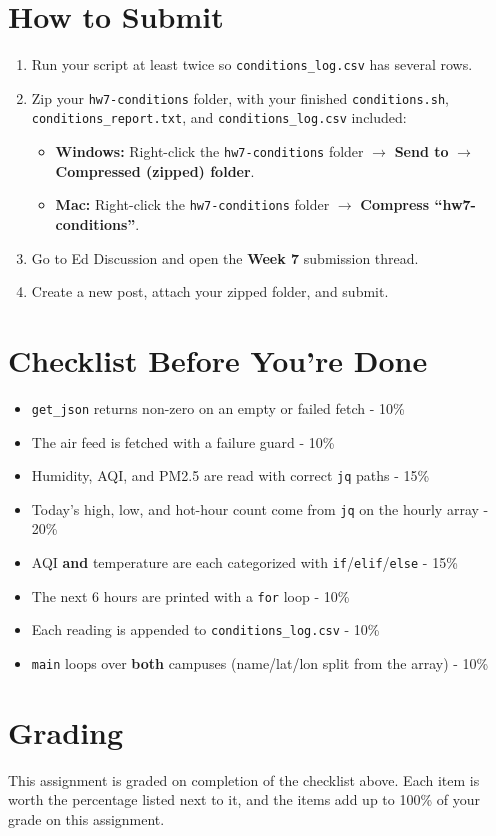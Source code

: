 \documentclass[11pt]{article}
\begin{document}
\section{How to Submit}
\begin{enumerate}
    \item Run your script at least twice so \texttt{conditions\_log.csv} has several rows.
    \item Zip your \texttt{hw7-conditions} folder, with your finished \texttt{conditions.sh}, \texttt{conditions\_report.txt}, and \texttt{conditions\_log.csv} included:
    \begin{itemize}
        \item \textbf{Windows:} Right-click the \texttt{hw7-conditions} folder \(\rightarrow\) \textbf{Send to} \(\rightarrow\) \textbf{Compressed (zipped) folder}.
        \item \textbf{Mac:} Right-click the \texttt{hw7-conditions} folder \(\rightarrow\) \textbf{Compress ``hw7-conditions''}.
    \end{itemize}
    \item Go to Ed Discussion and open the \textbf{Week 7} submission thread.
    \item Create a new post, attach your zipped folder, and submit.
\end{enumerate}

\section{Checklist Before You're Done}
\begin{itemize}
    \item \texttt{get\_json} returns non-zero on an empty or failed fetch - 10\%
    \item The air feed is fetched with a failure guard - 10\%
    \item Humidity, AQI, and PM2.5 are read with correct \texttt{jq} paths - 15\%
    \item Today's high, low, and hot-hour count come from \texttt{jq} on the hourly array - 20\%
    \item AQI \textbf{and} temperature are each categorized with \texttt{if}/\texttt{elif}/\texttt{else} - 15\%
    \item The next 6 hours are printed with a \texttt{for} loop - 10\%
    \item Each reading is appended to \texttt{conditions\_log.csv} - 10\%
    \item \texttt{main} loops over \textbf{both} campuses (name/lat/lon split from the array) - 10\%
\end{itemize}

\section{Grading}
This assignment is graded on completion of the checklist above. Each item is worth the percentage listed next to it, and the items add up to 100\% of your grade on this assignment.
\end{document}
